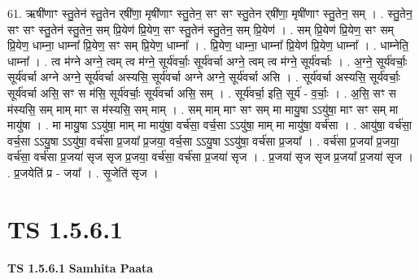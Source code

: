 \documentclass[17pt]{extarticle}
\begin{document}
61. ऋषी॑णाꣳ स्तु॒तेन॑ स्तु॒तेन र्‌षी॑णा॒ मृषी॑णाꣳ स्तु॒तेन॒ सꣳ सꣳ स्तु॒तेन र्‌षी॑णा॒ मृषी॑णाꣳ स्तु॒तेन॒ सम् । . स्तु॒तेन॒ सꣳ सꣳ स्तु॒तेन॑ स्तु॒तेन॒ सम् प्रि॒येण॑ प्रि॒येण॒ सꣳ स्तु॒तेन॑ स्तु॒तेन॒ सम् प्रि॒येण॑ । . सम् प्रि॒येण॑ प्रि॒येण॒ सꣳ सम् प्रि॒येण॒ धाम्ना॒ धाम्ना᳚ प्रि॒येण॒ सꣳ सम् प्रि॒येण॒ धाम्ना᳚ । . प्रि॒येण॒ धाम्ना॒ धाम्ना᳚ प्रि॒येण॑ प्रि॒येण॒ धाम्ना᳚ । . धाम्नेति॒ धाम्ना᳚ । . त्व म॑ग्ने अग्ने॒ त्वम् त्व म॑ग्ने॒ सूर्य॑वर्चाः॒ सूर्य॑वर्चा अग्ने॒ त्वम् त्व म॑ग्ने॒ सूर्य॑वर्चाः । . अ॒ग्ने॒ सूर्य॑वर्चाः॒ सूर्य॑वर्चा अग्ने अग्ने॒ सूर्य॑वर्चा अस्यसि॒ सूर्य॑वर्चा अग्ने अग्ने॒ सूर्य॑वर्चा असि । . सूर्य॑वर्चा अस्यसि॒ सूर्य॑वर्चाः॒ सूर्य॑वर्चा असि॒ सꣳ स म॑सि॒ सूर्य॑वर्चाः॒ सूर्य॑वर्चा असि॒ सम् । . सूर्य॑वर्चा॒ इति॒ सूर्य॑ - व॒र्चाः॒ । . अ॒सि॒ सꣳ स म॑स्यसि॒ सम् माम् माꣳ स म॑स्यसि॒ सम् माम् । . सम् माम् माꣳ सꣳ सम् मा मायु॒षा ऽऽयु॑षा॒ माꣳ सꣳ सम् मा मायु॑षा । . मा मायु॒षा ऽऽयु॑षा॒ माम् मा मायु॑षा॒ वर्च॑सा॒ वर्च॒सा ऽऽयु॑षा॒ माम् मा मायु॑षा॒ वर्च॑सा । . आयु॑षा॒ वर्च॑सा॒ वर्च॒सा ऽऽयु॒षा ऽऽयु॑षा॒ वर्च॑सा प्र॒जया᳚ प्र॒जया॒ वर्च॒सा ऽऽयु॒षा ऽऽयु॑षा॒ वर्च॑सा प्र॒जया᳚ । . वर्च॑सा प्र॒जया᳚ प्र॒जया॒ वर्च॑सा॒ वर्च॑सा प्र॒जया॑ सृज सृज प्र॒जया॒ वर्च॑सा॒ वर्च॑सा प्र॒जया॑ सृज । . प्र॒जया॑ सृज सृज प्र॒जया᳚ प्र॒जया॑ सृज । . प्र॒जयेति॑ प्र - जया᳚ । . सृ॒जेति॑ सृज । \newline
\pagebreak
{}

\section{ TS 1.5.6.1 }

\textbf{TS 1.5.6.1 } \newline
\textbf{Samhita Paata} \newline
\end{document}
